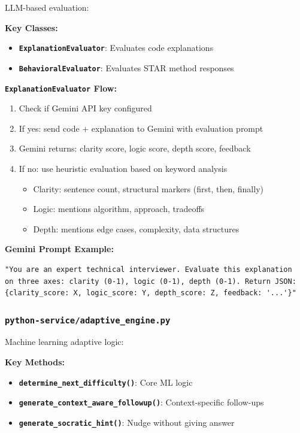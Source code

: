 \documentclass[12pt,a4paper,oneside]{article}
\newcommand{\fileref}[1]{\texttt{#1}}
\newcommand{\funcname}[1]{\texttt{\textbf{#1}}}
\newcommand{\classname}[1]{\texttt{\textbf{#1}}}
\begin{document}
LLM-based evaluation:

\textbf{Key Classes:}

\begin{itemize}
    \item \classname{ExplanationEvaluator}: Evaluates code explanations
    \item \classname{BehavioralEvaluator}: Evaluates STAR method responses
\end{itemize}

\textbf{\classname{ExplanationEvaluator} Flow:}

\begin{enumerate}
    \item Check if Gemini API key configured
    \item If yes: send code + explanation to Gemini with evaluation prompt
    \item Gemini returns: clarity score, logic score, depth score, feedback
    \item If no: use heuristic evaluation based on keyword analysis
    \begin{itemize}
        \item Clarity: sentence count, structural markers (first, then, finally)
        \item Logic: mentions algorithm, approach, tradeoffs
        \item Depth: mentions edge cases, complexity, data structures
    \end{itemize}
\end{enumerate}

\textbf{Gemini Prompt Example:}

\begin{verbatim}
"You are an expert technical interviewer. Evaluate this explanation
on three axes: clarity (0-1), logic (0-1), depth (0-1). Return JSON:
{clarity_score: X, logic_score: Y, depth_score: Z, feedback: '...'}"
\end{verbatim}

\subsubsection{\fileref{python-service/adaptive\_engine.py}}

Machine learning adaptive logic:

\textbf{Key Methods:}

\begin{itemize}
    \item \funcname{determine\_next\_difficulty()}: Core ML logic
    \item \funcname{generate\_context\_aware\_followup()}: Context-specific follow-ups
    \item \funcname{generate\_socratic\_hint()}: Nudge without giving answer
\end{itemize}
\end{document}
